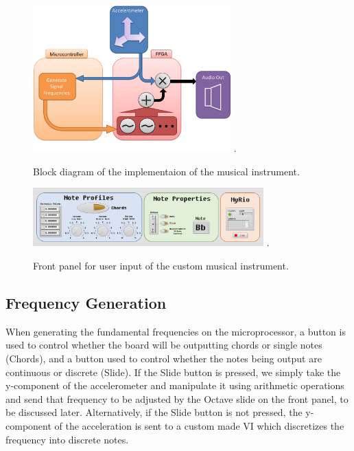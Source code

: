 \begin{figure}[!t]
\centering
\includegraphics[width=3in]{part1blockdiagram.png}
\DeclareGraphicsExtensions.
\caption{Block diagram of the implementaion of the musical instrument.}
\label{fig_p1block}
\end{figure} 

\begin{figure}[!t]
\centering
\includegraphics[width=3.5in]{instrumentfrontpanel.png}
\DeclareGraphicsExtensions.
\caption{Front panel for user input of the custom musical instrument.}
\label{fig_p1front}
\end{figure} 


\subsection{Frequency Generation}

When generating the fundamental frequencies on the microprocessor, a button is used to control whether the board will be outputting chords or single notes (Chords), and a button used to control whether the notes being output are continuous or discrete (Slide).
 If the Slide button is pressed, we simply take the y-component of the accelerometer and manipulate it using arithmetic operations and send that frequency to be adjusted by the Octave slide on the front panel, to be discussed later.
 Alternatively, if the Slide button is not pressed, the y-component of the acceleration is sent to a custom made VI which discretizes the frequency into discrete notes.

